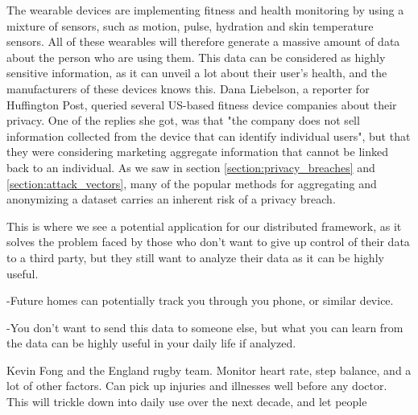 The wearable devices are implementing fitness and health monitoring by using a mixture of sensors, such as motion, pulse, hydration and skin temperature sensors. All of these wearables will therefore generate a massive amount of data about the person who are using them. This data can be considered as highly sensitive information, as it can unveil a lot about their user's health, and the manufacturers of these devices knows this. Dana Liebelson, a reporter for Huffington Post, queried several US-based fitness device companies about their privacy. One of the replies she got, was that "the company does not sell information collected from the device that can identify individual users", but that they were considering marketing aggregate information that cannot be linked back to an individual. As we saw in section \ref{section:privacy_breaches} and \ref{section:attack_vectors}, many of the popular methods for aggregating and anonymizing a dataset carries an inherent risk of a privacy breach.

This is where we see a potential application for our distributed framework, as it solves the problem faced by those who don't want to give up control of their data to a third party, but they still want to analyze their data as it can be highly useful. 

-Future homes can potentially track you through you phone, or similar device. 

-You don't want to send this data to someone else, but what you can learn from the data can be highly useful in your daily life if analyzed. 

Kevin Fong and the England rugby team. Monitor heart rate, step balance, and a lot of other factors. Can pick up injuries and illnesses well before any doctor. This will trickle down into daily use over the next decade, and let people 


\cleardoublepage